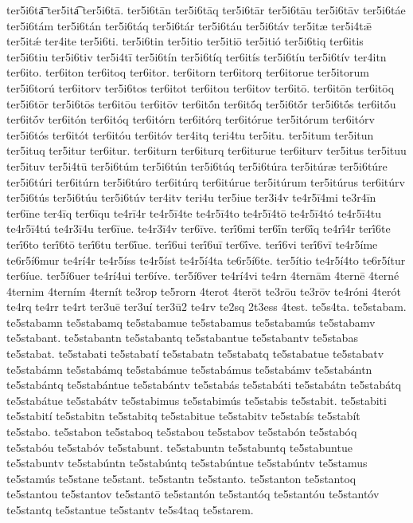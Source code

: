 {ter5i6ta͞
ter5ita͡
ter5i6tā.
ter5i6tān
ter5i6tāq
ter5i6tār
ter5i6tāu
ter5i6tāv
ter5i6táe
ter5i6tám
ter5i6tán
ter5i6táq
ter5i6tár
ter5i6táu
ter5i6táv
ter5itæ
ter5i4tǣ
ter5itǽ
ter4ite
ter5i6ti.
ter5i6tin
ter5itio
ter5itiō
ter5itió
ter5i6tiq
ter6itis
ter5i6tiu
ter5i6tiv
ter5i4tī
ter5i6tín
ter5i6tíq
ter6itís
ter5i6tíu
ter5i6tív
ter4itn
ter6ito.
ter6iton
ter6itoq
ter6itor.
ter6itorn
ter6itorq
ter6itorue
ter5itorum
ter5i6torú
ter6itorv
ter5i6tos
ter6itot
ter6itou
ter6itov
ter6itō.
ter6itōn
ter6itōq
ter5i6tōr
ter5i6tōs
ter6itōu
ter6itōv
ter6itṓn
ter6itṓq
ter5i6tṓr
ter5i6tṓs
ter6itṓu
ter6itṓv
ter6itón
ter6itóq
ter6itórn
ter6itórq
ter6itórue
ter5itórum
ter6itórv
ter5i6tós
ter6itót
ter6itóu
ter6itóv
ter4itq
teri4tu
ter5itu.
ter5itum
ter5itun
ter5ituq
ter5itur
ter6itur.
ter6iturn
ter6iturq
ter6iturue
ter6iturv
ter5itus
ter5ituu
ter5ituv
ter5i4tū
ter5i6túm
ter5i6tún
ter5i6túq
ter5i6túra
ter5itúræ
ter5i6túre
ter5i6túri
ter6itúrn
ter5i6túro
ter6itúrq
ter6itúrue
ter5itúrum
ter5itúrus
ter6itúrv
ter5i6tús
ter5i6túu
ter5i6túv
ter4itv
teri4u
ter5iue
ter3i4v
te4r5ī4mi
te3r4īn
ter6īne
ter4īq
ter6īqu
te4rī4r
te4r5ī4te
te4r5ī4to
te4r5ī4tō
te4r5ī4tó
te4r5ī4tu
te4r5ī4tú
te4r3ī4u
ter6īue.
te4r3ī4v
ter6īve.
terī́6mi
ter6ī́n
ter6ī́q
te4rī́4r
terī́6te
terī́6to
terī́6tō
terī́6tu
ter6ī́ue.
terī́6ui
terī́6uī
ter6ī́ve.
terī́6vi
terī́6vī
te4r5íme
te6r5í6mur
te4rí4r
te4r5íss
te4r5íst
te4r5í4ta
te6r5í6te.
ter5ítio
te4r5í4to
te6r5ítur
ter6íue.
ter5í6uer
te4rí4ui
ter6íve.
ter5í6ver
te4rí4vi
te4rn
4ternām
4ternē
4terné
4ternim
4terním
4ternít
te3rop
te5rorn
4terot
4terōt
te3rōu
te3rōv
te4róni
4terót
te4rq
te4rr
te4rt
ter3uē
ter3uí
ter3ū2
te4rv
te2sq
2t3ess
4test.
te5s4ta.
te5stabam.
te5stabamn
te5stabamq
te5stabamue
te5stabamus
te5stabamús
te5stabamv
te5stabant.
te5stabantn
te5stabantq
te5stabantue
te5stabantv
te5stabas
te5stabat.
te5stabati
te5stabatí
te5stabatn
te5stabatq
te5stabatue
te5stabatv
te5stabámn
te5stabámq
te5stabámue
te5stabámus
te5stabámv
te5stabántn
te5stabántq
te5stabántue
te5stabántv
te5stabás
te5stabáti
te5stabátn
te5stabátq
te5stabátue
te5stabátv
te5stabimus
te5stabimús
te5stabis
te5stabit.
te5stabiti
te5stabití
te5stabitn
te5stabitq
te5stabitue
te5stabitv
te5stabís
te5stabít
te5stabo.
te5stabon
te5staboq
te5stabou
te5stabov
te5stabón
te5stabóq
te5stabóu
te5stabóv
te5stabunt.
te5stabuntn
te5stabuntq
te5stabuntue
te5stabuntv
te5stabúntn
te5stabúntq
te5stabúntue
te5stabúntv
te5stamus
te5stamús
te5stane
te5stant.
te5stantn
te5stanto.
te5stanton
te5stantoq
te5stantou
te5stantov
te5stantō
te5stantón
te5stantóq
te5stantóu
te5stantóv
te5stantq
te5stantue
te5stantv
te5s4taq
te5starem.
}
